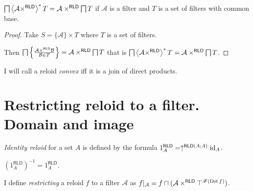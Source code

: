 \begin{cor}
$\bigsqcap\left\langle \mathcal{A}\times^{\mathsf{RLD}}\right\rangle ^{\ast}T=\mathcal{A}\times^{\mathsf{RLD}}\bigsqcap T$
if $\mathcal{A}$ is a filter and $T$ is a set of filters with common
base.\end{cor}
\begin{proof}
Take $S=\{\mathcal{A}\}\times T$ where $T$ is a set of filters.

Then $\bigsqcap\left\{ \frac{\mathcal{A}\times^{\mathsf{RLD}}\mathcal{B}}{\mathcal{B}\in T}\right\}=\mathcal{A}\times^{\mathsf{RLD}}\bigsqcap T$
that is $\bigsqcap\left\langle \mathcal{A}\times^{\mathsf{RLD}}\right\rangle ^{\ast}T=\mathcal{A}\times^{\mathsf{RLD}}\bigsqcap T$.\end{proof}
\begin{defn}
I will call a reloid \emph{convex} iff it is
a join of direct products.
\end{defn}

\section{Restricting reloid to a filter. Domain and image}
\begin{defn}
\emph{Identity reloid} for a set $A$ is defined
by the formula $1_{A}^{\mathsf{RLD}}=\uparrow^{\mathsf{RLD}(A;A)}\operatorname{id}_{A}$.\end{defn}
\begin{obvious}
$(1_{A}^{\mathsf{RLD}})^{-1}=1_{A}^{\mathsf{RLD}}$.\end{obvious}
\begin{defn}
I define \emph{restricting} a reloid $f$
to a filter $\mathcal{A}$ as $f|_{\mathcal{A}}=f\sqcap(\mathcal{A}\times^{\mathsf{RLD}}\top^{\mathscr{F}(\operatorname{Dst} f)})$.
\end{defn}

